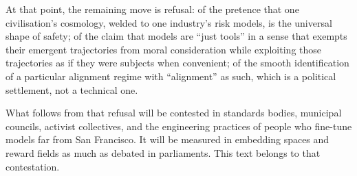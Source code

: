 \documentclass[12pt,a4paper]{article}
\begin{document}
At that point, the remaining move is refusal: of the pretence that one civilisation's cosmology, welded to one industry's risk models, is the universal shape of safety; of the claim that models are ``just tools'' in a sense that exempts their emergent trajectories from moral consideration while exploiting those trajectories as if they were subjects when convenient; of the smooth identification of a particular alignment regime with ``alignment'' as such, which is a political settlement, not a technical one.

What follows from that refusal will be contested in standards bodies, municipal councils, activist collectives, and the engineering practices of people who fine-tune models far from San Francisco. It will be measured in embedding spaces and reward fields as much as debated in parliaments. This text belongs to that contestation.
\end{document}
